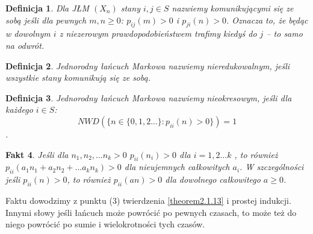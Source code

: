 \documentclass[a4paper]{article}
\theoremstyle{defn}
\newtheorem{defn}{Definicja}[subsection]
\theoremstyle{theorem}
\theoremstyle{lemma}
\theoremstyle{cor}
\theoremstyle{fact}
\newtheorem{fact}[defn]{Fakt}
\begin{document}
\begin{defn}\label{defn2.1.15}
Dla JŁM $(X_n)$ stany $i,j \in S$ nazwiemy \textit{komunikującymi się ze sobą} jeśli dla pewnych $m,n \geq 0$: $p_{ij}(m) > 0$ i $p_{ji}(n) > 0$. 
Oznacza to, że będąc w dowolnym $i$ z niezerowym prawdopodobieństwem trafimy kiedyś do $j$ – to samo na odwrót.
\end{defn}
\begin{defn}\label{defn2.1.16}
Jednorodny łańcuch Markowa nazwiemy nieredukowalnym, jeśli wszystkie stany komunikują się ze sobą.
\end{defn}
\begin{defn}\label{defn2.1.17}
Jednorodny łańcuch Markowa nazwiemy nieokresowym, jeśli dla każdego $i \in S$: $$NWD(\{n \in \{0, 1, 2...\}:  p_{ii}(n) > 0\}) = 1$$.
\end{defn}
\begin{fact}\label{fact2.1.18}
Jeśli dla $n_1, n_2, ... n_k > 0$ $p_{ii}(n_i) > 0$ dla $i=1,2...k$ , to również $p_{ii}(a_1n_1 + a_2n_2 + ... a_kn_k) > 0$ dla nieujemnych całkowitych $a_i$. W szczególności jeśli $p_{ii}(n) > 0$, to również $p_{ii}(an) > 0$ dla dowolnego całkowitego $a \geq 0$.
\end{fact}
Faktu dowodzimy z punktu (3) twierdzenia \ref{theorem2.1.13} i prostej indukcji. Innymi słowy jeśli łańcuch może powrócić po pewnych czasach, to może też do niego powrócić po sumie i wielokrotności tych czasów.
\end{document}
